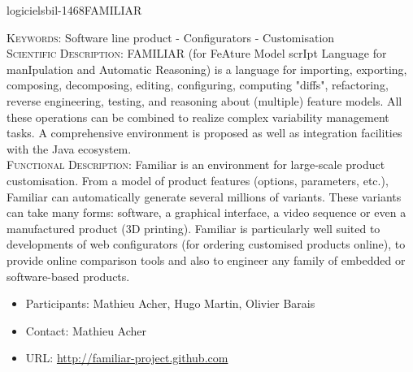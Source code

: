 \documentclass{ra2018}
\begin{document}
 \begin{module}{logiciels}{bil-1468}{FAMILIAR}

   \textsc{Keywords:} Software line product - Configurators - Customisation \\ 


    \textsc{Scientific Description:} FAMILIAR (for FeAture Model scrIpt Language for manIpulation and Automatic Reasoning) is a language for importing, exporting, composing, decomposing, editing, configuring, computing "diffs", refactoring, reverse engineering, testing, and reasoning about (multiple) feature models. All these operations can be combined to realize complex variability management tasks. 
A comprehensive environment is proposed as well as integration facilities with the Java ecosystem.\\

 \textsc{Functional Description:}  Familiar is an environment for large-scale product customisation. From a model of product features (options, parameters, etc.), Familiar can automatically generate several millions of variants. These variants can take many forms: software, a graphical interface, a video sequence or even a manufactured product (3D printing). Familiar is particularly well suited to developments of web configurators (for ordering customised products online), to provide online comparison tools and also to engineer any family of embedded or software-based products.\\

   \begin{itemize}
      \item Participants: Mathieu Acher, Hugo Martin, Olivier Barais
      \item Contact: Mathieu Acher
      \item URL: \url{http://familiar-project.github.com}
   \end{itemize}

 \end{module}
\end{document}
